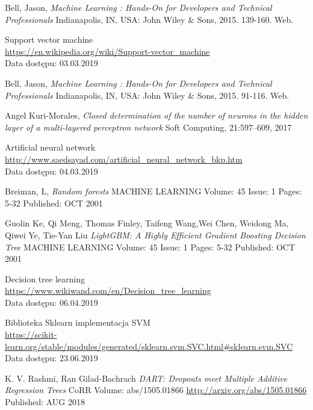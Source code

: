 \documentclass[a4paper, twoside, 11pt, openright]{article}
\begin{document}
\begin{thebibliography}{9}
	Bell, Jason, \textit{Machine Learning : Hands-On for Developers and Technical Professionals}  Indianapolis, IN, USA: John Wiley \& Sons, 2015. 139-160. Web.
	
	Support vector machine
	\\\url{https://en.wikipedia.org/wiki/Support-vector_machine} 
	\\Data dostępu: 03.03.2019

	Bell, Jason, \textit{Machine Learning : Hands-On for Developers and Technical Professionals}  Indianapolis, IN, USA: John Wiley \& Sons, 2015. 91-116. Web.


	Angel Kuri-Morales, 
  \textit{Closed determination of the number of neurons in the hidden layer of a multi-layered perceptron network}
  Soft Computing, 21:597–609, 2017

	Artificial neural network
	\\\url{http://www.saedsayad.com/artificial_neural_network_bkp.htm} 
	\\Data dostępu: 04.03.2019

	Breiman, L, 
  \textit{Random forests}
	MACHINE LEARNING  Volume: 45   Issue: 1   Pages: 5-32   Published: OCT 2001

Guolin Ke, Qi Meng, Thomas Finley, Taifeng Wang,Wei Chen, Weidong Ma, Qiwei Ye, Tie-Yan Liu
  \textit{LightGBM: A Highly Efficient Gradient Boosting Decision Tree}
	MACHINE LEARNING  Volume: 45   Issue: 1   Pages: 5-32   Published: OCT 2001

	Decision tree learning
	\\\url{https://www.wikiwand.com/en/Decision_tree_learning} 
	\\Data dostępu: 06.04.2019

	Biblioteka Sklearn implementacja SVM
	\\\url{https://scikit-learn.org/stable/modules/generated/sklearn.svm.SVC.html#sklearn.svm.SVC}
	\\Data dostępu: 23.06.2019

	K. V. Rashmi, Ran Gilad-Bachrach
	\textit{DART: Dropouts meet Multiple Additive Regression Trees}
	CoRR Volume: abs/1505.01866 \url{http://arxiv.org/abs/1505.01866} Published: AUG 2018

\end{thebibliography}

\newpage
\end{document}
